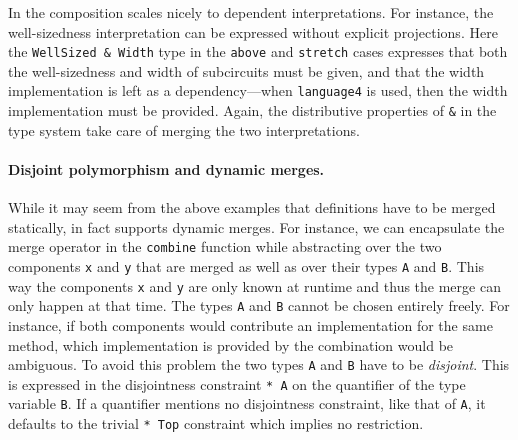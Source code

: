 In \sedel the composition scales nicely to dependent interpretations.
For instance, the well-sizedness interpretation can be expressed without
explicit projections.
Here the \lstinline{WellSized & Width} type in the \lstinline{above} and \lstinline{stretch} cases
expresses that both the well-sizedness and width of subcircuits must be given,
and that the width implementation is left as a dependency---when \lstinline{language4} is used,
then the width implementation must be provided.
Again, the distributive properties of \lstinline{&} in the type system take care of
merging the two interpretations.

\paragraph{Disjoint polymorphism and dynamic merges.}

While it may seem from the above examples that definitions have to be merged
statically, \sedel in fact supports dynamic merges. For instance, we can
encapsulate the merge operator in the \lstinline{combine} function while
abstracting over the two components \lstinline{x} and \lstinline{y} that are merged
as well as over their types \lstinline{A} and \lstinline{B}.
This way the components \lstinline{x} and \lstinline{y} are only known at runtime and
thus the merge can only happen at that time.
The types \lstinline{A} and \lstinline{B} cannot be chosen entirely freely. For
instance, if both components would contribute an implementation for the same
method, which implementation is provided by the combination would be ambiguous.
To avoid this problem the two types \lstinline{A} and \lstinline{B} have to be
\emph{disjoint}. This is expressed in the disjointness constraint \lstinline{* A}
on the quantifier of the type variable \lstinline{B}. If a quantifier mentions
no disjointness constraint, like that of \lstinline{A}, it defaults to the
trivial \lstinline{* Top} constraint which implies no restriction.


